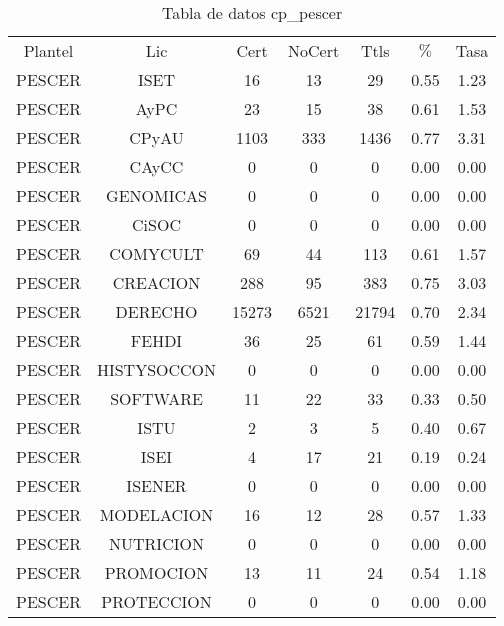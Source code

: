 \documentclass{article}
\begin{document}
\begin{table}[h]
\centering
\begin{tabular}{ccccccc}

Plantel & Lic & Cert & NoCert & Ttls & $\%$ & Tasa \\

PESCER & ISET & 16 & 13 & 29 & 0.55 & 1.23 \\
PESCER & AyPC & 23 & 15 & 38 & 0.61 & 1.53 \\
PESCER & CPyAU & 1103 & 333 & 1436 & 0.77 & 3.31 \\
PESCER & CAyCC & 0 & 0 & 0 & 0.00 & 0.00 \\
PESCER & GENOMICAS & 0 & 0 & 0 & 0.00 & 0.00 \\
PESCER & CiSOC & 0 & 0 & 0 & 0.00 & 0.00 \\
PESCER & COMYCULT & 69 & 44 & 113 & 0.61 & 1.57 \\
PESCER & CREACION & 288 & 95 & 383 & 0.75 & 3.03 \\
PESCER & DERECHO & 15273 & 6521 & 21794 & 0.70 & 2.34 \\
PESCER & FEHDI & 36 & 25 & 61 & 0.59 & 1.44 \\
PESCER & HISTYSOCCON & 0 & 0 & 0 & 0.00 & 0.00 \\
PESCER & SOFTWARE & 11 & 22 & 33 & 0.33 & 0.50 \\
PESCER & ISTU & 2 & 3 & 5 & 0.40 & 0.67 \\
PESCER & ISEI & 4 & 17 & 21 & 0.19 & 0.24 \\
PESCER & ISENER & 0 & 0 & 0 & 0.00 & 0.00 \\
PESCER & MODELACION & 16 & 12 & 28 & 0.57 & 1.33 \\
PESCER & NUTRICION & 0 & 0 & 0 & 0.00 & 0.00 \\
PESCER & PROMOCION & 13 & 11 & 24 & 0.54 & 1.18 \\
PESCER & PROTECCION & 0 & 0 & 0 & 0.00 & 0.00 \\

\end{tabular}
\caption{Tabla de datos cp\_pescer}
\end{table}

\newpage
\end{document}
